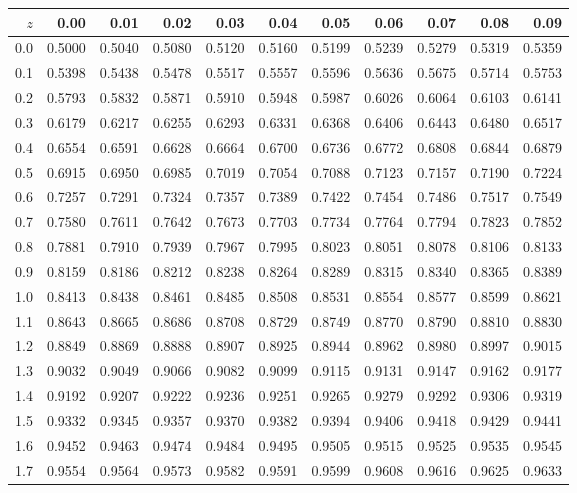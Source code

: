 \begin{mvtable}
{
\begin{tabular}{r|*{10}{r}}
\toprule
$z$ & 0.00 & 0.01 & 0.02 & 0.03 & 0.04 & 0.05 & 0.06 & 0.07 & 0.08 & 0.09\\
\midrule
0.0 & 0.5000 & 0.5040 & 0.5080 & 0.5120 & 0.5160 & 0.5199 & 0.5239 & 0.5279 & 0.5319 & 0.5359\\
0.1 & 0.5398 & 0.5438 & 0.5478 & 0.5517 & 0.5557 & 0.5596 & 0.5636 & 0.5675 & 0.5714 & 0.5753\\
0.2 & 0.5793 & 0.5832 & 0.5871 & 0.5910 & 0.5948 & 0.5987 & 0.6026 & 0.6064 & 0.6103 & 0.6141\\
0.3 & 0.6179 & 0.6217 & 0.6255 & 0.6293 & 0.6331 & 0.6368 & 0.6406 & 0.6443 & 0.6480 & 0.6517\\
0.4 & 0.6554 & 0.6591 & 0.6628 & 0.6664 & 0.6700 & 0.6736 & 0.6772 & 0.6808 & 0.6844 & 0.6879\\
0.5 & 0.6915 & 0.6950 & 0.6985 & 0.7019 & 0.7054 & 0.7088 & 0.7123 & 0.7157 & 0.7190 & 0.7224\\
0.6 & 0.7257 & 0.7291 & 0.7324 & 0.7357 & 0.7389 & 0.7422 & 0.7454 & 0.7486 & 0.7517 & 0.7549\\
0.7 & 0.7580 & 0.7611 & 0.7642 & 0.7673 & 0.7703 & 0.7734 & 0.7764 & 0.7794 & 0.7823 & 0.7852\\
0.8 & 0.7881 & 0.7910 & 0.7939 & 0.7967 & 0.7995 & 0.8023 & 0.8051 & 0.8078 & 0.8106 & 0.8133\\
0.9 & 0.8159 & 0.8186 & 0.8212 & 0.8238 & 0.8264 & 0.8289 & 0.8315 & 0.8340 & 0.8365 & 0.8389\\
1.0 & 0.8413 & 0.8438 & 0.8461 & 0.8485 & 0.8508 & 0.8531 & 0.8554 & 0.8577 & 0.8599 & 0.8621\\
1.1 & 0.8643 & 0.8665 & 0.8686 & 0.8708 & 0.8729 & 0.8749 & 0.8770 & 0.8790 & 0.8810 & 0.8830\\
1.2 & 0.8849 & 0.8869 & 0.8888 & 0.8907 & 0.8925 & 0.8944 & 0.8962 & 0.8980 & 0.8997 & 0.9015\\
1.3 & 0.9032 & 0.9049 & 0.9066 & 0.9082 & 0.9099 & 0.9115 & 0.9131 & 0.9147 & 0.9162 & 0.9177\\
1.4 & 0.9192 & 0.9207 & 0.9222 & 0.9236 & 0.9251 & 0.9265 & 0.9279 & 0.9292 & 0.9306 & 0.9319\\
1.5 & 0.9332 & 0.9345 & 0.9357 & 0.9370 & 0.9382 & 0.9394 & 0.9406 & 0.9418 & 0.9429 & 0.9441\\
1.6 & 0.9452 & 0.9463 & 0.9474 & 0.9484 & 0.9495 & 0.9505 & 0.9515 & 0.9525 & 0.9535 & 0.9545\\
1.7 & 0.9554 & 0.9564 & 0.9573 & 0.9582 & 0.9591 & 0.9599 & 0.9608 & 0.9616 & 0.9625 & 0.9633\\

\end{tabular}}
\end{mvtable}
